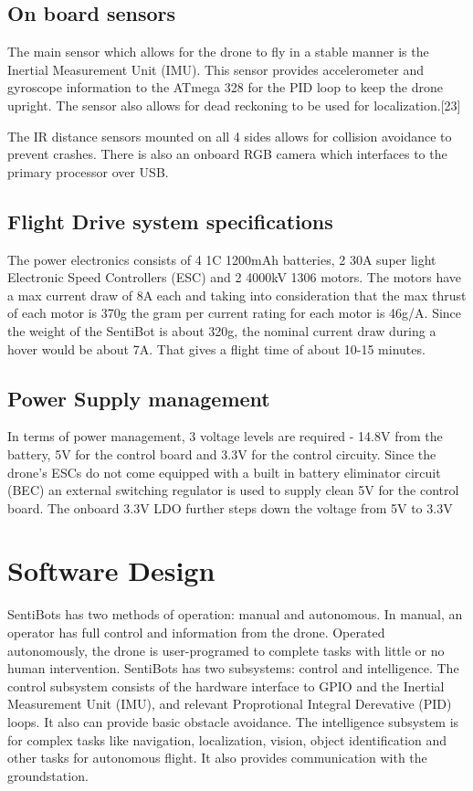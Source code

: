 \documentclass[12pt]{article}
\begin{document}
\subsection{On board sensors}

The main sensor which allows for the drone to fly in a stable manner is the Inertial Measurement Unit (IMU). This sensor provides accelerometer and gyroscope information to the ATmega 328 for the PID loop to keep the drone upright. The sensor also allows for dead reckoning to be used for localization.[23]

The IR distance sensors mounted on all 4 sides allows for collision avoidance to prevent crashes. There is also an onboard RGB camera which interfaces to the primary processor over USB. 

\subsection{Flight Drive system specifications}

The power electronics consists of 4 1C 1200mAh batteries, 2 30A super light Electronic Speed Controllers (ESC) and 2 4000kV 1306 motors. The motors have a max current draw of 8A each and taking into consideration that the max thrust of each motor is 370g the gram per current rating for each motor is 46g/A. Since the weight of the SentiBot is about 320g, the nominal current draw during a hover would be about 7A. That gives a flight time of about 10-15 minutes. 

\subsection{Power Supply management}

In terms of power management, 3 voltage levels are required - 14.8V from the battery, 5V for the control board and 3.3V for the control circuity. Since the drone’s ESCs do not come equipped with a built in battery eliminator circuit (BEC) an external switching regulator is used to supply clean 5V for the control board. The onboard 3.3V LDO further steps down the voltage from 5V to 3.3V

\section{Software Design}

SentiBots has two methods of operation: manual and autonomous. In manual, an operator has full control and information from the drone. Operated autonomously, the drone is user-programed to complete tasks with little or no human intervention. SentiBots has two subsystems: control and intelligence. The control subsystem consists of the hardware interface to GPIO and the Inertial Measurement Unit (IMU), and relevant Proprotional Integral Derevative (PID) loops. It also can provide basic obstacle avoidance. The intelligence subsystem is for complex tasks like navigation, localization, vision, object identification and other tasks for autonomous flight. It also provides communication with the groundstation.
\end{document}
